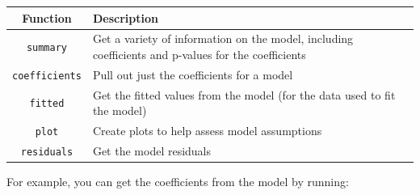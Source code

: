 \documentclass[]{book}
\begin{document}
\begin{longtable}[c]{@{}cl@{}}
\toprule
\begin{minipage}[b]{0.19\columnwidth}\centering\strut
Function
\strut\end{minipage} &
\begin{minipage}[b]{0.75\columnwidth}\raggedright\strut
Description
\strut\end{minipage}\tabularnewline
\midrule
\endhead
\begin{minipage}[t]{0.19\columnwidth}\centering\strut
\texttt{summary}
\strut\end{minipage} &
\begin{minipage}[t]{0.75\columnwidth}\raggedright\strut
Get a variety of information on the model, including coefficients and
p-values for the coefficients
\strut\end{minipage}\tabularnewline
\begin{minipage}[t]{0.19\columnwidth}\centering\strut
\texttt{coefficients}
\strut\end{minipage} &
\begin{minipage}[t]{0.75\columnwidth}\raggedright\strut
Pull out just the coefficients for a model
\strut\end{minipage}\tabularnewline
\begin{minipage}[t]{0.19\columnwidth}\centering\strut
\texttt{fitted}
\strut\end{minipage} &
\begin{minipage}[t]{0.75\columnwidth}\raggedright\strut
Get the fitted values from the model (for the data used to fit the
model)
\strut\end{minipage}\tabularnewline
\begin{minipage}[t]{0.19\columnwidth}\centering\strut
\texttt{plot}
\strut\end{minipage} &
\begin{minipage}[t]{0.75\columnwidth}\raggedright\strut
Create plots to help assess model assumptions
\strut\end{minipage}\tabularnewline
\begin{minipage}[t]{0.19\columnwidth}\centering\strut
\texttt{residuals}
\strut\end{minipage} &
\begin{minipage}[t]{0.75\columnwidth}\raggedright\strut
Get the model residuals
\strut\end{minipage}\tabularnewline
\bottomrule
\end{longtable}

For example, you can get the coefficients from the model by running:
\end{document}
